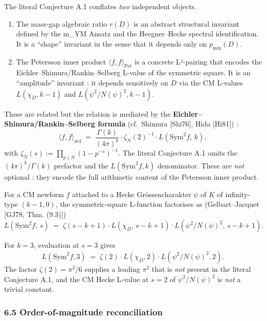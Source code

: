 \documentclass[
  11pt,
  a4paper,
]{amsart}
\providecommand{\tightlist}{\setlength{\itemsep}{0pt}\setlength{\parskip}{0pt}}
\providecommand{\tightlist}{%
  \setlength{\itemsep}{0pt}\setlength{\parskip}{0pt}}
\begin{document}
The literal Conjecture A.1 conflates \emph{two} independent objects.

\begin{enumerate}
\def\labelenumi{\arabic{enumi}.}
\tightlist
\item
  The mass-gap algebraic ratio \(r(D)\) is an abstract structural invariant defined by the m\_YM Ansatz and the Heegner--Hecke spectral identification. It is a ``shape'' invariant in the sense that it depends only on \(p_{\min}(D)\).
\item
  The Petersson inner product \(\langle f, f\rangle_{\mathrm{Pet}}\) is a concrete L²-pairing that encodes the Eichler--Shimura/Rankin--Selberg L-value of the symmetric square. It is an ``amplitude'' invariant : it depends sensitively on \(D\) via the CM L-values \(L(\chi_D, k-1)\) and \(L(\psi^{2}/N(\psi)^{2}, k-1)\).
\end{enumerate}

These are related but the relation is mediated by the \textbf{Eichler--Shimura/Rankin--Selberg formula} (cf.~Shimura {[}Shi76{]}, Hida {[}Hi81{]}) :
\[
\langle f, f\rangle_{\mathrm{std}} \;=\; \frac{\Gamma(k)}{(4\pi)^{k}}\cdot \zeta_N(2)^{-1}\cdot L(\mathrm{Sym}^{2} f,\, k),
\]
with \(\zeta_N(s) := \prod_{p\nmid N}(1-p^{-s})^{-1}\). The literal Conjecture A.1 omits the \((4\pi)^{k}/\Gamma(k)\) prefactor and the \(L(\mathrm{Sym}^{2} f, k)\) denominator. These are \emph{not} optional : they encode the full arithmetic content of the Petersson inner product.

For a CM newform \(f\) attached to a Hecke Grössencharakter \(\psi\) of \(K\) of infinity-type \((k-1, 0)\), the symmetric-square L-function factorises as (Gelbart--Jacquet {[}GJ78, Thm. (9.3){]})
\[
L(\mathrm{Sym}^{2} f,\, s) \;=\; \zeta(s - k + 1)\cdot L(\chi_D,\, s - k + 1)\cdot L(\psi^{2}/N(\psi)^{2},\, s - k + 1).
\]

For \(k = 3\), evaluation at \(s = 3\) gives
\[
L(\mathrm{Sym}^{2} f, 3) \;=\; \zeta(2)\cdot L(\chi_D, 2)\cdot L(\psi^{2}/N(\psi)^{2}, 2).
\]
The factor \(\zeta(2) = \pi^{2}/6\) supplies a leading \(\pi^{2}\) that is \emph{not} present in the literal Conjecture A.1, and the CM Hecke L-value at \(s = 2\) of \(\psi^{2}/N(\psi)^{2}\) is \emph{not} a trivial constant.

\hypertarget{order-of-magnitude-reconciliation}{%
\subsubsection{6.5 Order-of-magnitude reconciliation}\label{order-of-magnitude-reconciliation}}
\end{document}
